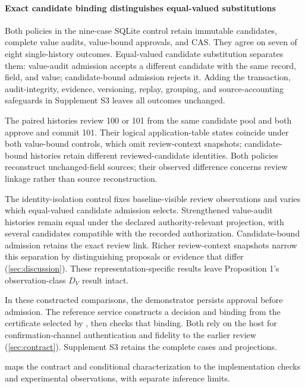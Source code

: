 \paragraph{Exact candidate binding distinguishes equal-valued substitutions}
\label{sec:executable-relation-result}
Both policies in the nine-case SQLite control retain immutable candidates, complete value audits, value-bound approvals, and CAS. They agree on seven of eight single-history outcomes. Equal-valued candidate substitution separates them: value-audit admission accepts a different candidate with the same record, field, and value; candidate-bound admission rejects it. Adding the transaction, audit-integrity, evidence, versioning, replay, grouping, and source-accounting safeguards in Supplement S3 leaves all outcomes unchanged.

The paired histories review 100 or 101 from the same candidate pool and both approve and commit 101. Their logical application-table states coincide under both value-bound controls, which omit review-context snapshots; candidate-bound histories retain different reviewed-candidate identities. Both policies reconstruct unchanged-field sources; their observed difference concerns review linkage rather than source reconstruction.

The identity-isolation control fixes baseline-visible review observations and varies which equal-valued candidate admission selects. Strengthened value-audit histories remain equal under the declared authority-relevant projection, with several candidates compatible with the recorded authorization. Candidate-bound admission retains the exact review link. Richer review-context snapshots narrow this separation by distinguishing proposals or evidence that differ (\cref{sec:discussion}). These representation-specific results leave Proposition 1's observation-class $D_V$ result intact.

In these constructed comparisons, the demonstrator persists approval before admission. The reference service constructs a decision and binding from the certificate selected by , then checks that binding. Both rely on the host for confirmation-channel authentication and fidelity to the earlier review (\cref{sec:contract}). Supplement S3 retains the complete cases and projections.

 maps the contract and conditional characterization to the implementation checks and experimental observations, with separate inference limits.

